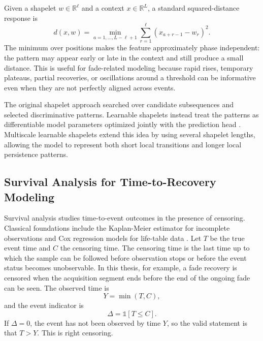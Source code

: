 Given a shapelet \(w\in\mathbb{R}^{\ell}\) and a context
\(x\in\mathbb{R}^{L}\), a standard squared-distance response is
\[
  d(x,w)
  =
  \min_{a=1,\ldots,L-\ell+1}
  \sum_{r=1}^{\ell}
  \left(x_{a+r-1}-w_r\right)^2 .
\]
The minimum over positions makes the feature approximately phase independent:
the pattern may appear early or late in the context and still produce a small
distance. This is useful for fade-related modeling because rapid rises,
temporary plateaus, partial recoveries, or oscillations around a threshold can
be informative even when they are not perfectly aligned across events.

The original shapelet approach searched over candidate subsequences and
selected discriminative patterns. Learnable shapelets instead treat the patterns
as differentiable model parameters optimized jointly with the prediction head
\cite{grabocka2014learning}. Multiscale learnable shapelets extend this idea by
using several shapelet lengths, allowing the model to represent both short
local transitions and longer local persistence patterns.


\subsection{Survival Analysis for Time-to-Recovery Modeling}
\label{sec:background-survival}

Survival analysis studies time-to-event outcomes in the presence of censoring.
Classical foundations include the Kaplan-Meier estimator for incomplete
observations \cite{kaplan1958nonparametric} and Cox regression models for
life-table data \cite{cox1972regression}. Let \(T\) be the true event time and
\(C\) the censoring time. The censoring time is the last time up to which the
sample can be followed before observation stops or before the event status
becomes unobservable. In this thesis, for example, a fade recovery is censored
when the acquisition segment ends before the end of the ongoing fade can be
seen. The observed time is
\[
  Y = \min(T,C),
\]
and the event indicator is
\[
  \Delta = \mathbb{1}[T \le C].
\]
If \(\Delta=0\), the event has not been observed by time \(Y\), so the valid
statement is that \(T>Y\). This is right censoring.

